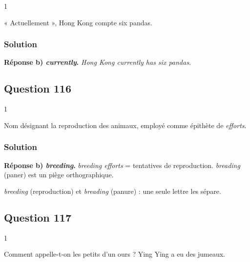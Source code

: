 \documentclass[11pt,a4paper]{article}
\begin{document}
\begin{indication}{1}

« Actuellement », Hong Kong compte six pandas.

\end{indication}

\hypertarget{solution-114}{%
\subsubsection{Solution}\label{solution-114}}

\textbf{Réponse b) \emph{currently}.} \emph{Hong Kong currently has six pandas}.

\hypertarget{question-116}{%
\subsection{Question 116}\label{question-116}}

\begin{indication}{1}

Nom désignant la reproduction des animaux, employé comme épithète de \emph{efforts}.

\end{indication}

\hypertarget{solution-115}{%
\subsubsection{Solution}\label{solution-115}}

\textbf{Réponse b) \emph{breeding}.} \emph{breeding efforts} = tentatives de reproduction. \emph{breading} (paner) est un piège orthographique.

\begin{piege}

\emph{breeding} (reproduction) et \emph{breading} (panure) : une seule lettre les sépare.

\end{piege}

\hypertarget{question-117}{%
\subsection{Question 117}\label{question-117}}

\begin{indication}{1}

Comment appelle-t-on les petits d'un ours ? Ying Ying a eu des jumeaux.

\end{indication}
\end{document}
